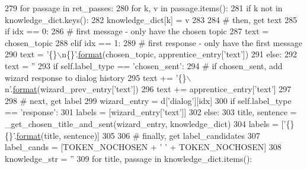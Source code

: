 \begin{DoxyCode}
279             \textcolor{keywordflow}{for} passage \textcolor{keywordflow}{in} ret\_passes:
280                 \textcolor{keywordflow}{for} k, v \textcolor{keywordflow}{in} passage.items():
281                     \textcolor{keywordflow}{if} k \textcolor{keywordflow}{not} \textcolor{keywordflow}{in} knowledge\_dict.keys():
282                         knowledge\_dict[k] = v
283 
284         \textcolor{comment}{# then, get text}
285         \textcolor{keywordflow}{if} idx == 0:
286             \textcolor{comment}{# first message - only have the chosen topic}
287             text = chosen\_topic
288         \textcolor{keywordflow}{elif} idx == 1:
289             \textcolor{comment}{# first response - only have the first message}
290             text = \textcolor{stringliteral}{'\{\}\(\backslash\)n\{\}'}.\hyperlink{namespaceparlai_1_1chat__service_1_1services_1_1messenger_1_1shared__utils_a32e2e2022b824fbaf80c747160b52a76}{format}(chosen\_topic, apprentice\_entry[\textcolor{stringliteral}{'text'}])
291         \textcolor{keywordflow}{else}:
292             text = \textcolor{stringliteral}{''}
293             \textcolor{keywordflow}{if} self.label\_type == \textcolor{stringliteral}{'chosen\_sent'}:
294                 \textcolor{comment}{# if chosen\_sent, add wizard response to dialog history}
295                 text += \textcolor{stringliteral}{'\{\}\(\backslash\)n'}.\hyperlink{namespaceparlai_1_1chat__service_1_1services_1_1messenger_1_1shared__utils_a32e2e2022b824fbaf80c747160b52a76}{format}(wizard\_prev\_entry[\textcolor{stringliteral}{'text'}])
296             text += apprentice\_entry[\textcolor{stringliteral}{'text'}]
297 
298         \textcolor{comment}{# next, get label}
299         wizard\_entry = d[\textcolor{stringliteral}{'dialog'}][idx]
300         \textcolor{keywordflow}{if} self.label\_type == \textcolor{stringliteral}{'response'}:
301             labels = [wizard\_entry[\textcolor{stringliteral}{'text'}]]
302         \textcolor{keywordflow}{else}:
303             title, sentence = \_get\_chosen\_title\_and\_sent(wizard\_entry, knowledge\_dict)
304             labels = [\textcolor{stringliteral}{'\{\} \{\}'}.\hyperlink{namespaceparlai_1_1chat__service_1_1services_1_1messenger_1_1shared__utils_a32e2e2022b824fbaf80c747160b52a76}{format}(title, sentence)]
305 
306         \textcolor{comment}{# finally, get label\_candidates}
307         label\_cands = [TOKEN\_NOCHOSEN + \textcolor{stringliteral}{' '} + TOKEN\_NOCHOSEN]
308         knowledge\_str = \textcolor{stringliteral}{''}
309         \textcolor{keywordflow}{for} title, passage \textcolor{keywordflow}{in} knowledge\_dict.items():

\end{DoxyCode}
